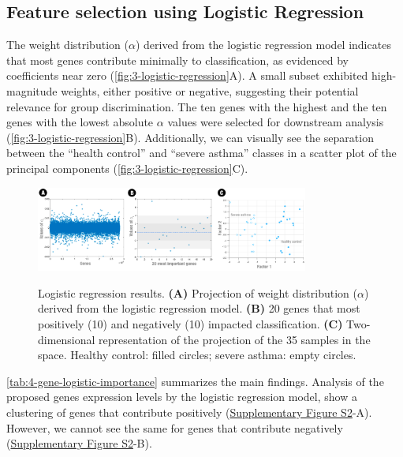 \subsection{Feature selection using Logistic Regression} %

The weight distribution ($\alpha$) derived from the logistic regression model indicates that most genes contribute minimally to classification, as evidenced by coefficients near zero (\autoref{fig:3-logistic-regression}A). A small subset exhibited high-magnitude weights, either positive or negative, suggesting their potential relevance for group discrimination. The ten genes with the highest and the ten genes with the lowest absolute $\alpha$ values were selected for downstream analysis (\autoref{fig:3-logistic-regression}B). Additionally, we can visually see the separation between the ``health control'' and ``severe asthma'' classes in a scatter plot of the principal components (\autoref{fig:3-logistic-regression}C).

\begin{figure}[htbp] \centering
  \includegraphics[width=0.8\textwidth]{figures/3-logistic_regression.png}
  \label{fig:3-logistic-regression}
  \caption{Logistic regression results. \textbf{(A)} Projection of weight distribution ($\alpha$) derived from the logistic regression model. \textbf{(B)} 20 genes that most positively (10) and negatively (10) impacted classification. \textbf{(C)} Two-dimensional representation of the projection of the 35 samples in the space. Healthy control: filled circles; severe asthma: empty circles.}
\end{figure} %

\autoref{tab:4-gene-logistic-importance} summarizes the main findings. Analysis of the proposed genes expression levels by the logistic regression model, show a clustering of genes that contribute positively (\href{https://github.com/LBS-UFMG/asthma_microarray/blob/main/supplementary_material.pdf}{Supplementary Figure S2}-A). However, we cannot see the same for genes that contribute negatively (\href{https://github.com/LBS-UFMG/asthma_microarray/blob/main/supplementary_material.pdf}{Supplementary Figure S2}-B).

